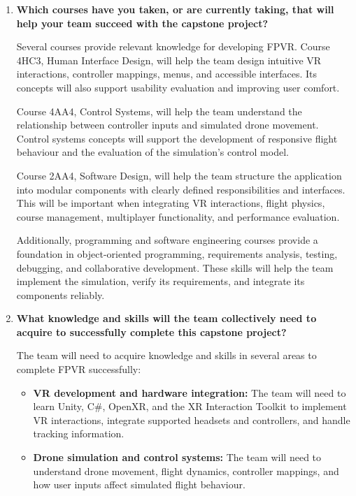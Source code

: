 \documentclass{article}
\begin{document}
\begin{enumerate}
    \item \textbf{Which courses have you taken, or are currently
    taking, that will help your team succeed with the capstone project?}

    Several courses provide relevant knowledge for developing FPVR.
    Course 4HC3, Human Interface Design, will help the team design
    intuitive VR interactions, controller mappings, menus, and
    accessible interfaces. Its concepts will also support usability
    evaluation and improving user comfort.

    Course 4AA4, Control Systems, will help the team understand
    the relationship between controller inputs and simulated drone
    movement. Control systems concepts will support the development
    of responsive flight behaviour and the evaluation of the
    simulation's control model.

    Course 2AA4, Software Design, will help the team structure the
    application into modular components with clearly defined
    responsibilities and interfaces. This will be important when
    integrating VR interactions, flight physics, course management,
    multiplayer functionality, and performance evaluation.

    Additionally, programming and software engineering courses
    provide a foundation in object-oriented programming, requirements
    analysis, testing, debugging, and collaborative development.
    These skills will help the team implement the simulation,
    verify its requirements, and integrate its components reliably.

    \item \textbf{What knowledge and skills will the team collectively
    need to acquire to successfully complete this capstone project?}

    The team will need to acquire knowledge and skills in several
    areas to complete FPVR successfully:

    \begin{itemize}
        \item \textbf{VR development and hardware integration:}
        The team will need to learn Unity, C\#, OpenXR, and the
        XR Interaction Toolkit to implement VR interactions,
        integrate supported headsets and controllers, and handle
        tracking information.

        \item \textbf{Drone simulation and control systems:}
        The team will need to understand drone movement, flight
        dynamics, controller mappings, and how user inputs affect
        simulated flight behaviour.


\end{itemize}
\end{enumerate}
\end{document}
